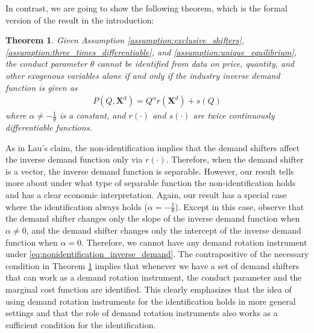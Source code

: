\documentclass[11pt, a4paper]{article}
\newtheorem{theorem}{Theorem}
\begin{document}
In contrast, we are going to show the following theorem, which is the formal version of the result in the introduction:
\begin{theorem}\label{theorem:identification_characterization}
    Given Assumption \ref{assumption:exclusive_shifters}, \ref{assumption:three_times_differentiable}, and  \ref{assumption:unique_equilibrium}, the conduct parameter $\theta$ cannot be identified from data on price, quantity, and other exogenous variables alone if and only if the industry inverse demand function is given as
    \begin{align}
        P(Q, \bm{X}^{d}) = Q^{\alpha}r(\bm{X}^{d}) + s(Q) \label{eq:nonidentification_inverse_demand}
    \end{align}
    where $\alpha \ne -\frac{1}{\theta}$ is a constant, and $r(\cdot)$ and $s(\cdot)$ are twice continuously differentiable functions.
\end{theorem}
As in Lau's claim, the non-identification implies that the demand shifters affect the inverse demand function only via $r(\cdot)$.
Therefore, when the demand shifter is a vector, the inverse demand function is separable.
However, our result tells more about under what type of separable function the non-identification holds and has a clear economic interpretation.
Again, our result has a special case where the identification always holds ($\alpha = - \frac{1}{\theta}$).
Except in this case, observe that the demand shifter changes only the slope of the inverse demand function when $\alpha \ne 0$, and the demand shifter changes only the intercept of the inverse demand function when $\alpha = 0$.
Therefore, we cannot have any demand rotation instrument under \eqref{eq:nonidentification_inverse_demand}.
The contrapositive of the necessary condition in Theorem \ref{theorem:identification_characterization} implies that whenever we have a set of demand shifters that can work as a demand rotation instrument, the conduct parameter and the marginal cost function are identified.
This clearly emphasizes that the idea of \citet{bresnahanOligopoly1982} using demand rotation instruments for the identification holds in more general settings and that the role of demand rotation instruments also works as a sufficient condition for the identification.
\end{document}
